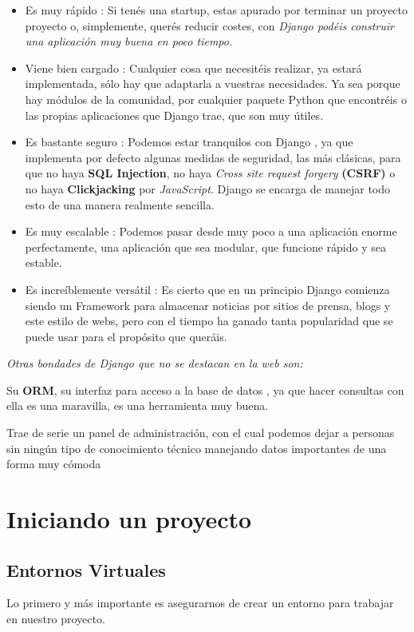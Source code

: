 \documentclass[10pt]{article}
\newcommand{\py}[1]{{\textcolor{B}{Python} #1}}
\newcommand{\django}[1]{{\textcolor{G}{Django} #1}}
\begin{document}
\begin{itemize}

\item Es muy rápido : Si tenés una startup, estas apurado por terminar un proyecto proyecto o, simplemente, querés reducir costes, con \textit{\django{} podéis construir una aplicación muy buena en poco tiempo.}
 
 \item Viene bien cargado : Cualquier cosa que necesitéis realizar, ya estará implementada, sólo hay que adaptarla a vuestras necesidades. Ya sea porque hay módulos de la comunidad, por cualquier paquete \py{} que encontréis o las propias aplicaciones que \django{} trae, que son muy útiles.
 
 \item Es bastante seguro : Podemos estar tranquilos con \django{}, ya que implementa por defecto algunas medidas de seguridad, las más clásicas, para que no haya \textbf{SQL Injection}, no haya \textit{Cross site request forgery} \textbf{(CSRF)} o no haya \textbf{Clickjacking} por \textit{JavaScript}. \django{} se encarga de manejar todo esto de una manera realmente sencilla.
 
 \item Es muy escalable : Podemos pasar desde muy poco a una aplicación enorme perfectamente, una aplicación que sea modular, que funcione rápido y sea estable.
 
 \item Es increíblemente versátil : Es cierto que en un principio \django{} comienza siendo un Framework para almacenar noticias por sitios de prensa, blogs y este estilo de webs, pero con el tiempo ha ganado tanta popularidad que se puede usar para el propósito que queráis.
\end{itemize}

\textit{Otras bondades de \django{} que no se destacan en la web son:}

Su \textbf{ORM}, su interfaz para acceso a la base de datos , ya que hacer consultas con ella es una maravilla, es una herramienta muy buena.

Trae de serie un panel de administración, con el cual podemos dejar a personas sin ningún tipo de conocimiento técnico manejando datos importantes de una forma muy cómoda


\section{Iniciando un proyecto}
\subsection{Entornos Virtuales}
Lo primero y más importante es asegurarnos de crear un entorno para trabajar en nuestro proyecto.
\end{document}
